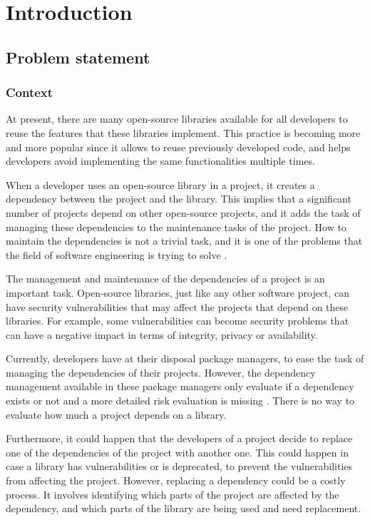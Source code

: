 \chapter{Introduction}\label{ch:Introduction}

\section{Problem statement}

\subsection{Context}
At present, there are many open-source libraries available for all developers to reuse the features that these libraries implement. This practice is becoming more and more popular since it allows to reuse previously developed code, and helps developers avoid implementing the same functionalities multiple times.

When a developer uses an open-source library in a project, it creates a dependency between the project and the library. This implies that a significant number of projects depend on other open-source projects, and it adds the task of managing these dependencies to the maintenance tasks of the project. How to maintain the dependencies is not a trivial task, and it is one of the problems that the field of software engineering is trying to solve \cite{kula2014visualizing}.

The management and maintenance of the dependencies of a project is an important task. Open-source libraries, just like any other software project, can have security vulnerabilities that may affect the projects that depend on these libraries. For example, some vulnerabilities can become security problems that can have a negative impact in terms of integrity, privacy or availability.


\blankl %
Currently, developers have at their disposal package managers, to ease the task of managing the dependencies of their projects. However, the dependency management available in these package managers only evaluate if a dependency exists or not and a more detailed risk evaluation is missing \cite{hejderup2018prazi}. There is no way to evaluate how much a project depends on a library.

Furthermore, it could happen that the developers of a project decide to replace one of the dependencies of the project with another one. This could happen in case a library has vulnerabilities or is deprecated, to prevent the vulnerabilities from affecting the project. However, replacing a dependency could be a costly process. It involves identifying which parts of the project are affected by the dependency, and which parts of the library are being used and need replacement.

